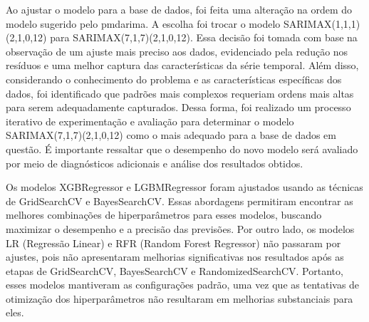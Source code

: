 Ao ajustar o modelo para a base de dados, foi feita uma alteração na ordem do modelo sugerido pelo pmdarima. A escolha foi trocar o modelo SARIMAX(1,1,1)(2,1,0,12) para SARIMAX(7,1,7)(2,1,0,12). Essa decisão foi tomada com base na observação de um ajuste mais preciso aos dados, evidenciado pela redução nos resíduos e uma melhor captura das características da série temporal. Além disso, considerando o conhecimento do problema e as características específicas dos dados, foi identificado que padrões mais complexos requeriam ordens mais altas para serem adequadamente capturados. Dessa forma, foi realizado um processo iterativo de experimentação e avaliação para determinar o modelo SARIMAX(7,1,7)(2,1,0,12) como o mais adequado para a base de dados em questão. É importante ressaltar que o desempenho do novo modelo será avaliado por meio de diagnósticos adicionais e análise dos resultados obtidos.

Os modelos XGBRegressor e LGBMRegressor foram ajustados usando as técnicas de GridSearchCV e BayesSearchCV. Essas abordagens permitiram encontrar as melhores combinações de hiperparâmetros para esses modelos, buscando maximizar o desempenho e a precisão das previsões. Por outro lado, os modelos LR (Regressão Linear) e RFR (Random Forest Regressor) não passaram por ajustes, pois não apresentaram melhorias significativas nos resultados após as etapas de GridSearchCV, BayesSearchCV e RandomizedSearchCV. Portanto, esses modelos mantiveram as configurações padrão, uma vez que as tentativas de otimização dos hiperparâmetros não resultaram em melhorias substanciais para eles.

